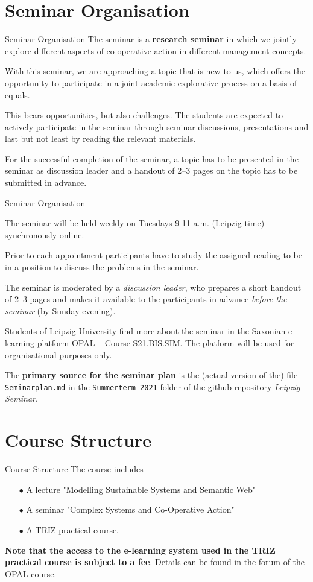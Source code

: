 \documentclass{beamer}
\begin{document}
\section{Seminar Organisation}
\begin{frame}{Seminar Organisation}\small
The seminar is a \textbf{research seminar} in which we jointly explore
different aspects of co-operative action in different management concepts.

With this seminar, we are approaching a topic that is new to us, which offers
the opportunity to participate in a joint academic explorative process on a
basis of equals.

This bears opportunities, but also challenges.  The students are expected to
actively participate in the seminar through seminar discussions, presentations
and last but not least by reading the relevant materials.

For the successful completion of the seminar, a topic has to be presented in
the seminar as discussion leader and a handout of 2--3 pages on the topic has
to be submitted in advance.
\end{frame}

\begin{frame}{Seminar Organisation}\small

The seminar will be held weekly on Tuesdays 9-11 a.m. (Leipzig time)
synchronously online.

Prior to each appointment participants have to study the assigned reading to
be in a position to discuss the problems in the seminar.

The seminar is moderated by a \emph{discussion leader}, who prepares a short
handout of 2--3 pages and makes it available to the participants in advance
\emph{before the seminar} (by Sunday evening).

Students of Leipzig University find more about the seminar in the Saxonian
e-learning platform OPAL -- Course S21.BIS.SIM.  The platform will be used for
organisational purposes only.

The \textbf{primary source for the seminar plan} is the (actual version of
the) file \texttt{Seminarplan.md} in the \texttt{Summerterm-2021} folder of
the github repository \emph{Leipzig-Seminar}.
\end{frame}

\section{Course Structure}
\begin{frame}{Course Structure}
The course includes

\begin{itemize}
\item[$\bullet$] A lecture "Modelling Sustainable Systems and Semantic Web"
\item[$\bullet$] A seminar "Complex Systems and Co-Operative Action"
\item[$\bullet$] A TRIZ practical course.
\end{itemize}
\textbf{Note that the access to the e-learning system used in the TRIZ
  practical course is subject to a fee}. Details can be found in the forum of
the OPAL course.
\end{frame}
\end{document}
